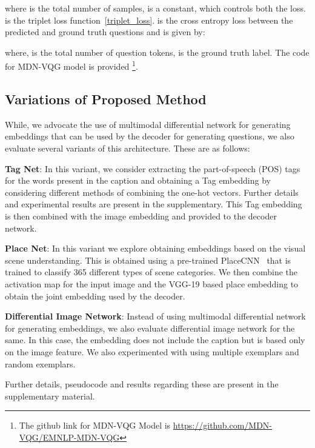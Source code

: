 \documentclass[11pt,a4paper]{article}
\begin{document}
where   is the total number of samples, is a constant, which controls both the loss.  is the triplet loss function~\ref{triplet_loss}.  is the cross entropy loss between the predicted and ground truth questions and is given by: 
 
where,  is the total number of question tokens,  is the ground truth label. The code for  MDN-VQG model is provided \footnote{The github link for MDN-VQG Model is \url{https://github.com/MDN-VQG/EMNLP-MDN-VQG}}. 



\subsection{Variations of Proposed Method}
\label{subsec:variants}
While, we advocate the use of multimodal differential network for generating embeddings that can be used by the decoder for generating questions, we also evaluate several variants of this architecture. These are as follows:



\textbf{Tag Net}: In this variant, we consider extracting the part-of-speech (POS) tags for the words present in the caption and obtaining a Tag embedding by considering different methods of combining the one-hot vectors. Further details and experimental results are present in the supplementary.
This Tag embedding is then combined with the image embedding and provided to the decoder network.  

\textbf{Place Net}: In this variant we explore obtaining embeddings based on the visual scene understanding. This is obtained using a pre-trained PlaceCNN~\cite{Zhou_PAMI2017} that is trained to classify 365 different types of scene categories. We then combine the activation map for the input image and the VGG-19 based place embedding to obtain the joint embedding used by the decoder. 

\textbf{Differential Image Network}: Instead of using multimodal differential network for generating embeddings, we also evaluate differential image network for the same. In this case, the embedding does not include the caption but is based only on the image feature. We also experimented with using multiple exemplars and random exemplars.

\noindent Further details, pseudocode and results regarding these are present in the supplementary material.
\end{document}
